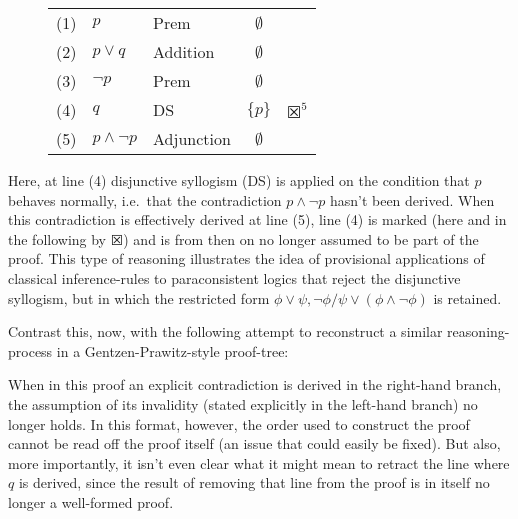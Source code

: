 \documentclass[]{article}
\begin{document}
\begin{figure}[ht!]
\centering
    \begin{tabular}{cllcl}
        (1) & $p$ & Prem & $\emptyset$\\
        (2) & $p \vee q$ & Addition & $\emptyset$\\
        (3) & $\neg p$ & Prem & $\emptyset$\\
        (4) & $q$ & DS & $\{p\}$ & $\XBox^5$\\
        (5) & $p \wedge \neg p$ & Adjunction & $\emptyset$
    \end{tabular}
\end{figure}
\noindent Here, at line (4) disjunctive syllogism (DS) is applied on the condition that $p$ behaves normally, i.e.\ that the contradiction $p \wedge \neg p$ hasn't been derived. When this contradiction is effectively derived at line (5), line (4) is marked (here and in the following by $\XBox$) and is from then on no longer assumed to be part of the proof. This type of reasoning illustrates the idea of provisional applications of classical inference-rules to paraconsistent logics that reject the disjunctive syllogism, but in which the restricted form $\phi \vee \psi, \neg \phi / \psi \vee (\phi \wedge \neg \phi)$ is retained.

Contrast this, now, with the following attempt to reconstruct a similar reasoning-process in a Gentzen-Prawitz-style proof-tree:

\begin{prooftree}
\end{prooftree}
When in this proof an explicit contradiction is derived in the right-hand branch, the assumption of its invalidity (stated explicitly in the left-hand branch) no longer holds. In this format, however, the order used to construct the proof cannot be read off the proof itself (an issue that could easily be fixed). But also, more importantly, it isn't even clear what it might mean to retract the line where $q$ is derived, since the result of removing that line from the proof is in itself no longer a well-formed proof.
\end{document}
